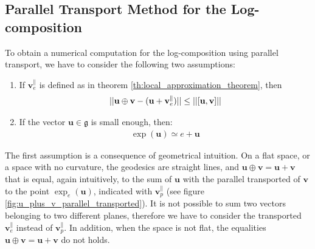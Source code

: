 \subsection{Parallel Transport Method for the Log-composition}
To obtain a numerical computation for the log-composition using parallel transport, we have to consider the following two assumptions: 
\begin{enumerate}
	\item If $\mathbf{v}_{e}^{\parallel} $ is defined as in theorem \ref{th:local_approximation_theorem}, then
	\begin{align*}
	\vert\lvert 
		\mathbf{u}\oplus \mathbf{v}  
		-
		(
		\mathbf{u} + \mathbf{v}_{e}^{\parallel} 
		)
	 \rvert\vert 
	\leq 
	\vert\lvert 
		[\mathbf{u}, \mathbf{v}]
		 \rvert\vert
	\end{align*}
	\item If the vector $\mathbf{u}\in\mathfrak{g}$ is small enough, then:
		\begin{align*}
		\exp(\mathbf{u}) \simeq e + \mathbf{u}
		\end{align*}
\end{enumerate}
The first assumption is a consequence of geometrical intuition. On a flat space, or a space with no curvature, the geodesics are straight lines, and $\mathbf{u}\oplus \mathbf{v} = \mathbf{u} + \mathbf{v} $ that is equal, again intuitively, to the sum of $\mathbf{u}$ with the parallel transported of $\mathbf{v}$ to the point $\exp_{e}(\mathbf{u})$, indicated with $\mathbf{v}_{p}^{\parallel} $ (see figure \ref{fig:u_plus_v_parallel_transported}). It is not possible to sum two vectors belonging to two different planes, therefore we have to consider the transported $\mathbf{v}_{e}^{\parallel} $ instead of $\mathbf{v}_{p}^{\parallel} $. In addition, when the space is not flat, the equalities $\mathbf{u}\oplus \mathbf{v} = \mathbf{u} + \mathbf{v} $ do not holds.

